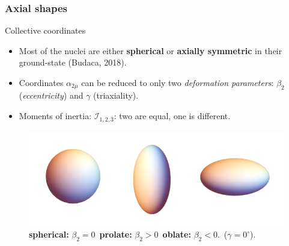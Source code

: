 \documentclass{beamer}
\begin{document}
\begin{frame}
	\frametitle{Axial shapes}
	\vspace{-0.2cm}
	\begin{block}{Collective coordinates}
		\begin{itemize}
			\item Most of the nuclei are either \textbf{spherical} or \textbf{axially symmetric} in their ground-state (Budaca, 2018).
            \item Coordinates $\alpha_{2\mu}$ can be reduced to only two \emph{deformation parameters}: $\beta_2$ (\emph{eccentricity}) and $\gamma$ (triaxiality).
            \item Moments of inertia: $\mathcal{I}_{1,2,3}$: two are equal, one is different.
		\end{itemize}
	\end{block}
	\vspace{-0.4cm}
	\begin{figure}
		\centering
		\includegraphics[scale=0.38]{figures/nuclear_shapes.png}
		\caption{\textbf{spherical:} $\beta_2=0$\ \textbf{prolate:} $\beta_2>0$\ \textbf{oblate:} $\beta_2<0$.\ ($\gamma=0^\circ$).}
	\end{figure}
\end{frame}
\end{document}
